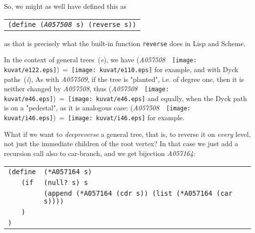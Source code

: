 \documentclass[11pt]{article} %
\newcommand{\catint}[1]{({\it #1})}
\newcommand{\autname}[1]{{\it *#1}}
\newcommand{\scmsym}[1]{{\tt{#1}}}
\newcommand{\scmcode}[1]{{\tt{#1}}}
\newenvironment{scmdefinefun5}{\begin{tabular}{l l l l p{5cm}}}{\end{tabular}}
\newcommand{\scmexmcomment}[1]{[\emph{#1}]}
\newcommand{\nilatom}{\ensuremath{\mathbf{(~)}}\xspace}
\begin{document}
So, we might as well have defined this as

\begin{center}
\begin{tabular}{l}
\scmcode{(define (\autname{A057508} s) (reverse s))}
\end{tabular}
\end{center}
as that is precisely what the built-in function \scmsym{reverse} does in
Lisp and Scheme.

In the context of general trees~\catint{e}, we have (\autname{A057508}~~\texttt{[image: kuvat/e122.eps]})~=~\texttt{[image: kuvat/e110.eps]} for example, and with Dyck paths~\catint{i},
As with \autname{A057509},  if the tree is "planted", i.e. of degree one, then
it is neither changed by \autname{A057508},
thus (\autname{A057508}~~\texttt{[image: kuvat/e46.eps]})~=~\texttt{[image: kuvat/e46.eps]}
and equally, when the Dyck path is on a "pedestal", as it is analogous case: (\autname{A057508}~~\texttt{[image: kuvat/i46.eps]})~=~\texttt{[image: kuvat/i46.eps]} for example.

What if we want to \emph{deepreverse} a general tree, that is, to
reverse it on \emph{every} level, not just the immediate children
of the root vertex? In that case we just add a recursion call also
to car-branch, and we get bijection \autname{A057164}:

\begin{scmdefinefun5}
\multicolumn{2}{l}{\scmcode{(define}} & \multicolumn{2}{l}{\scmcode{(*A057164 s)}}\\
 & \scmcode{(if} & \multicolumn{2}{l}{\scmcode{(null? s) s}}
 & \\ %
 &               & \multicolumn{2}{l}{\scmcode{(append (*A057164 (cdr s)) (list (*A057164 (car s))))}}
& \\ %
& \scmcode{)}\\
\scmcode{)}\\
\end{scmdefinefun5}

\end{document}
